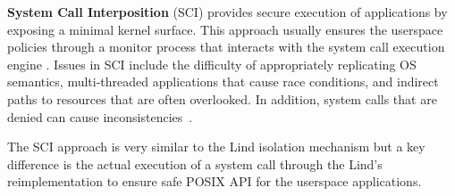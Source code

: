 \textbf{System Call Interposition} (SCI) provides
secure execution of applications by exposing a minimal kernel surface.
This approach usually ensures the userspace policies through a monitor process that
interacts with the system call execution engine
\cite{SCI-04}.
Issues in SCI include the difficulty of appropriately replicating OS semantics,
multi-threaded applications that cause race conditions, and indirect paths to resources that are often overlooked.
In addition, system calls that are denied can cause inconsistencies~\cite{Problems-SCI}.
%

%
%
%
The SCI approach is very similar to the Lind isolation mechanism but a key difference is the actual execution
of a system call through the Lind's reimplementation to ensure safe POSIX API for the userspace applications.

